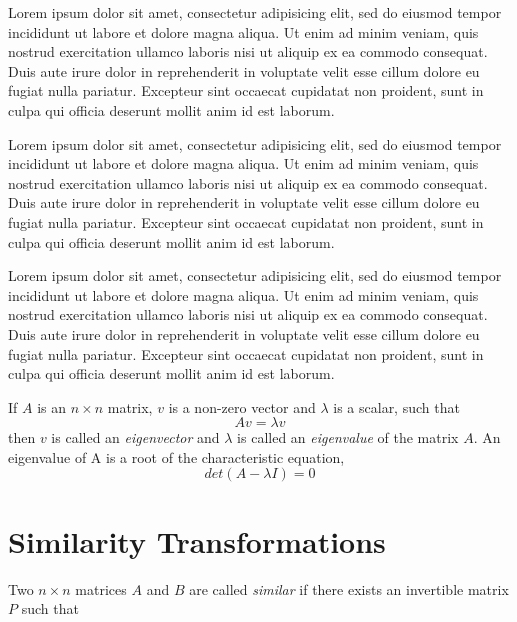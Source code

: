 \documentclass[12pt]{article}
\begin{document}
Lorem ipsum dolor sit amet, consectetur adipisicing elit, sed do eiusmod tempor incididunt ut labore et dolore magna aliqua. Ut enim ad minim veniam, quis nostrud exercitation ullamco laboris nisi ut aliquip ex ea commodo consequat. Duis aute irure dolor in reprehenderit in voluptate velit esse cillum dolore eu fugiat nulla pariatur. Excepteur sint occaecat cupidatat non proident, sunt in culpa qui officia deserunt mollit anim id est laborum.

Lorem ipsum dolor sit amet, consectetur adipisicing elit, sed do eiusmod tempor incididunt ut labore et dolore magna aliqua. Ut enim ad minim veniam, quis nostrud exercitation ullamco laboris nisi ut aliquip ex ea commodo consequat. Duis aute irure dolor in reprehenderit in voluptate velit esse cillum dolore eu fugiat nulla pariatur. Excepteur sint occaecat cupidatat non proident, sunt in culpa qui officia deserunt mollit anim id est laborum.

Lorem ipsum dolor sit amet, consectetur adipisicing elit, sed do eiusmod tempor incididunt ut labore et dolore magna aliqua. Ut enim ad minim veniam, quis nostrud exercitation ullamco laboris nisi ut aliquip ex ea commodo consequat. Duis aute irure dolor in reprehenderit in voluptate velit esse cillum dolore eu fugiat nulla pariatur. Excepteur sint occaecat cupidatat non proident, sunt in culpa qui officia deserunt mollit anim id est laborum.

\cite{MVA}
\cite{NME}
\cite{lapack}
If $A$ is an $n \times n$ matrix, $v$ is a non-zero vector and $\lambda$ is a scalar, such that
\begin{equation}
\label{eigenvalue-def}
Av = \lambda v
\end{equation}
then $v$ is called an \textit{eigenvector} and $\lambda$ is called an \textit{eigenvalue} of the matrix $A$.
An eigenvalue of A is a root of the characteristic equation,
\begin{equation}
\label{eigenvalue-solve}
det\left(A - \lambda I \right) = 0
\end{equation}


\section{Similarity Transformations}

Two $n \times n$ matrices $A$ and $B$ are called \textit{similar} if there exists an invertible matrix $P$ such that
\end{document}
